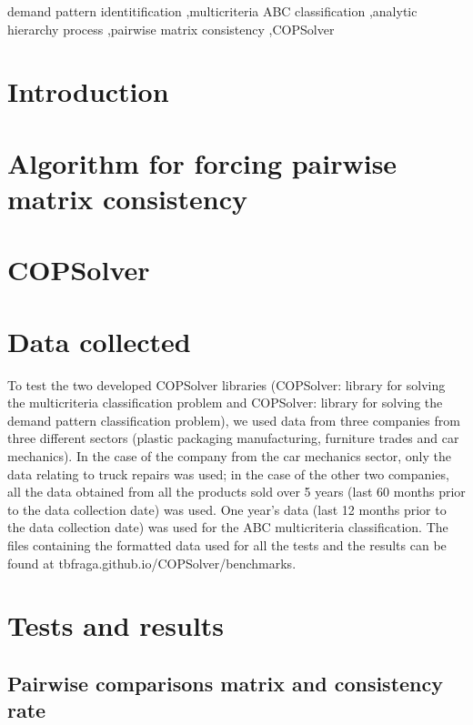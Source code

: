 \documentclass[authoryear,manuscript,12pt]{elsarticle}
\begin{document}
\begin{frontmatter}
\begin{keyword}
demand pattern identitification \sep multicriteria ABC classification \sep analytic hierarchy process \sep pairwise matrix consistency \sep COPSolver
\end{keyword}
\end{frontmatter}


\section{Introduction}
\label{sec:intro}


\section{Algorithm for forcing pairwise matrix consistency}

\section{COPSolver}

\section{Data collected}
\label{sec:data}

To test the two developed COPSolver libraries (COPSolver: library for solving the multicriteria classification problem and COPSolver: library for solving the demand pattern classification problem), we used data from three companies from three different sectors (plastic packaging manufacturing, furniture trades and car mechanics). In the case of the company from the car mechanics sector, only the data relating to truck repairs was used; in the case of the other two companies, all the data obtained from all the products sold over 5 years (last 60 months prior to the data collection date) was used. One year's data (last 12 months prior to the data collection date) was used for the ABC multicriteria classification. The files containing the formatted data used for all the tests and the results can be found at tbfraga.github.io/COPSolver/benchmarks. 

\section{Tests and results}
\label{sec:results}

\subsection{Pairwise comparisons matrix and consistency rate}
\end{document}
